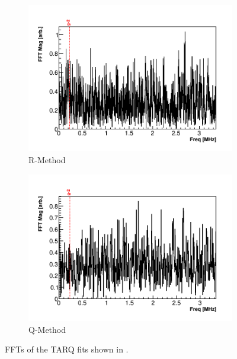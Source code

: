 \begin{figure}[]
    \begin{subfigure}[t]{0.45\textwidth}
        \centering
        \includegraphics[width=\textwidth]{FFT_RMethod}
        \caption{R-Method}
    \end{subfigure}
    \hspace{1mm}
    \begin{subfigure}[t]{0.45\textwidth}
        \centering
        \includegraphics[width=\textwidth]{FFT_QMethod}
        \caption{Q-Method}
    \end{subfigure}
\caption[]{FFTs of the TARQ fits shown in .}
\label{fig:FFTs}
\end{figure}


